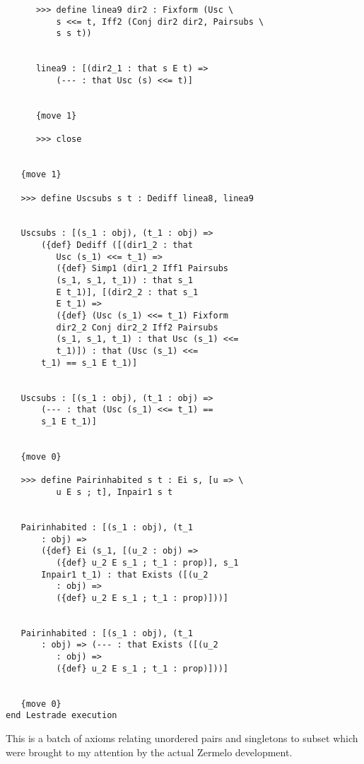 \documentclass[12pt]{article}
\begin{document}
\begin{verbatim}
      >>> define linea9 dir2 : Fixform (Usc \
          s <<= t, Iff2 (Conj dir2 dir2, Pairsubs \
          s s t))


      linea9 : [(dir2_1 : that s E t) => 
          (--- : that Usc (s) <<= t)]


      {move 1}

      >>> close


   {move 1}

   >>> define Uscsubs s t : Dediff linea8, linea9


   Uscsubs : [(s_1 : obj), (t_1 : obj) => 
       ({def} Dediff ([(dir1_2 : that 
          Usc (s_1) <<= t_1) => 
          ({def} Simp1 (dir1_2 Iff1 Pairsubs 
          (s_1, s_1, t_1)) : that s_1 
          E t_1)], [(dir2_2 : that s_1 
          E t_1) => 
          ({def} (Usc (s_1) <<= t_1) Fixform 
          dir2_2 Conj dir2_2 Iff2 Pairsubs 
          (s_1, s_1, t_1) : that Usc (s_1) <<= 
          t_1)]) : that (Usc (s_1) <<= 
       t_1) == s_1 E t_1)]


   Uscsubs : [(s_1 : obj), (t_1 : obj) => 
       (--- : that (Usc (s_1) <<= t_1) == 
       s_1 E t_1)]


   {move 0}

   >>> define Pairinhabited s t : Ei s, [u => \
          u E s ; t], Inpair1 s t


   Pairinhabited : [(s_1 : obj), (t_1 
       : obj) => 
       ({def} Ei (s_1, [(u_2 : obj) => 
          ({def} u_2 E s_1 ; t_1 : prop)], s_1 
       Inpair1 t_1) : that Exists ([(u_2 
          : obj) => 
          ({def} u_2 E s_1 ; t_1 : prop)]))]


   Pairinhabited : [(s_1 : obj), (t_1 
       : obj) => (--- : that Exists ([(u_2 
          : obj) => 
          ({def} u_2 E s_1 ; t_1 : prop)]))]


   {move 0}
end Lestrade execution
\end{verbatim}

This is a batch of axioms relating unordered pairs and singletons to subset which were brought to my attention by the actual Zermelo development.
\end{document}
